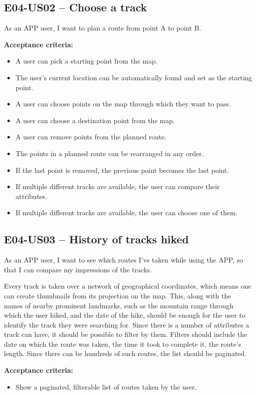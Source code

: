 \subsection*{E04-US02 -- Choose a track}
As an APP user, I want to plan a route from point A to point B.

\textbf{Acceptance criteria:}
\begin{itemize}
    \item A user can pick a starting point from the map.
    \item The user's current location can be automatically found and set as the starting point.
    \item A user can choose points on the map through which they want to pass.
    \item A user can choose a destination point from the map.
    \item A user can remove points from the planned route.
    \item The points in a planned route can be rearranged in any order.
    \item If the last point is removed, the previous point becomes the last point.
    \item If multiple different tracks are available, the user can compare their attributes.
    \item If multiple different tracks are available, the user can choose one of them.
\end{itemize}

\subsection*{E04-US03 -- History of tracks hiked}
As an APP user, I want to see which routes I've taken while using the APP, so that I can compare my impressions of the tracks.

Every track is taken over a network of geographical coordinates, which means one can create thumbnails from its projection on the map.
This, along with the names of nearby prominent landmarks, such as the mountain range through which the user hiked, and the date of the hike, should be enough for the user to identify the track they were searching for.
Since there is a number of attributes a track can have, it should be possible to filter by them.
Filters should include the date on which the route was taken, the time it took to complete it, the route's length.
Since there can be hundreds of such routes, the list should be paginated.

\textbf{Acceptance criteria:}
\begin{itemize}
    \item Show a paginated, filterable list of routes taken by the user.
\end{itemize}

